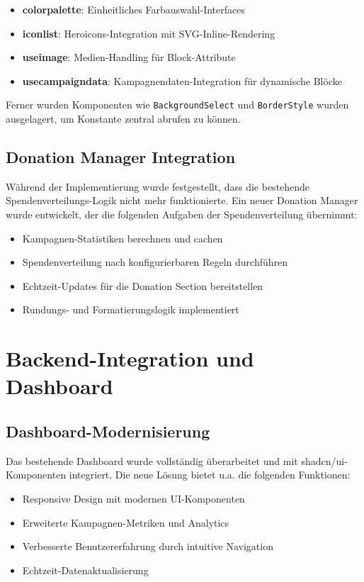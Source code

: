 \begin{itemize}
    \item \textbf{colorpalette}: Einheitliches Farbauswahl-Interfaces
    \item \textbf{iconlist}: Heroicons-Integration mit SVG-Inline-Rendering
    \item \textbf{useimage}: Medien-Handling für Block-Attribute
    \item \textbf{usecampaigndata}: Kampagnendaten-Integration für dynamische Blöcke
\end{itemize}

Ferner wurden Komponenten wie \texttt{BackgroundSelect} und \texttt{BorderStyle} wurden ausgelagert, um Konstante zentral abrufen zu können.

\subsection{Donation Manager Integration}
Während der Implementierung wurde festgestellt, dass die bestehende Spendenverteilungs-Logik nicht mehr funktionierte.
Ein neuer Donation Manager wurde entwickelt, der die folgenden Aufgaben der Spendenverteilung übernimmt:

\begin{itemize}
    \item Kampagnen-Statistiken berechnen und cachen
    \item Spendenverteilung nach konfigurierbaren Regeln durchführen
    \item Echtzeit-Updates für die Donation Section bereitstellen
    \item Rundungs- und Formatierungslogik implementiert
\end{itemize}

\section{Backend-Integration und Dashboard}
\subsection{Dashboard-Modernisierung}
Das bestehende Dashboard wurde vollständig überarbeitet und mit shadcn/ui-Komponenten integriert.
Die neue Lösung bietet u.a. die folgenden Funktionen:

\begin{itemize}
    \item Responsive Design mit modernen UI-Komponenten
    \item Erweiterte Kampagnen-Metriken und Analytics
    \item Verbesserte Benutzererfahrung durch intuitive Navigation
    \item Echtzeit-Datenaktualisierung
\end{itemize}

